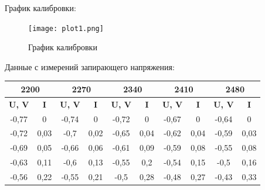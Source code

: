 \documentclass[a4paper, 12pt]{article}
\begin{document}
График калибровки:

\begin{figure}[H]
    \centering
    \texttt{[image: plot1.png]}
    \caption{График калибровки}
    \label{fig:calib}
\end{figure}

Данные с измерений запирающего напряжения:

\begin{table}[H]
	\centering
	\begin{tabular}{|cc|cc|cc|cc|cc|}
	\hline
	\multicolumn{2}{|c|}{\textbf{2200}}              & \multicolumn{2}{c|}{\textbf{2270}}              & \multicolumn{2}{c|}{\textbf{2340}}              & \multicolumn{2}{c|}{\textbf{2410}}              & \multicolumn{2}{c|}{\textbf{2480}}              \\ \hline
	\multicolumn{1}{|c|}{\textbf{U, V}} & \textbf{I} & \multicolumn{1}{c|}{\textbf{U, V}} & \textbf{I} & \multicolumn{1}{c|}{\textbf{U, V}} & \textbf{I} & \multicolumn{1}{c|}{\textbf{U, V}} & \textbf{I} & \multicolumn{1}{c|}{\textbf{U, V}} & \textbf{I} \\ \hline
	\multicolumn{1}{|c|}{-0,77}         & 0          & \multicolumn{1}{c|}{-0,74}         & 0          & \multicolumn{1}{c|}{-0,72}         & 0          & \multicolumn{1}{c|}{-0,67}         & 0          & \multicolumn{1}{c|}{-0,64}         & 0          \\ \hline
	\multicolumn{1}{|c|}{-0,72}         & 0,03       & \multicolumn{1}{c|}{-0,7}          & 0,02       & \multicolumn{1}{c|}{-0,65}         & 0,04       & \multicolumn{1}{c|}{-0,62}         & 0,04       & \multicolumn{1}{c|}{-0,59}         & 0,03       \\ \hline
	\multicolumn{1}{|c|}{-0,69}         & 0,05       & \multicolumn{1}{c|}{-0,66}         & 0,06       & \multicolumn{1}{c|}{-0,61}         & 0,09       & \multicolumn{1}{c|}{-0,59}         & 0,08       & \multicolumn{1}{c|}{-0,55}         & 0,08       \\ \hline
	\multicolumn{1}{|c|}{-0,63}         & 0,11       & \multicolumn{1}{c|}{-0,6}          & 0,13       & \multicolumn{1}{c|}{-0,55}         & 0,2        & \multicolumn{1}{c|}{-0,54}         & 0,15       & \multicolumn{1}{c|}{-0,5}          & 0,16       \\ \hline
	\multicolumn{1}{|c|}{-0,56}         & 0,22       & \multicolumn{1}{c|}{-0,55}         & 0,21       & \multicolumn{1}{c|}{-0,5}          & 0,28       & \multicolumn{1}{c|}{-0,48}         & 0,27       & \multicolumn{1}{c|}{-0,43}         & 0,33       \\ \hline

\end{tabular}
\end{table}
\end{document}
